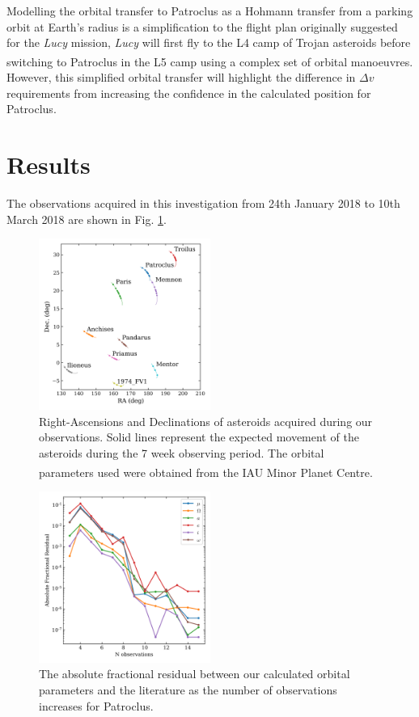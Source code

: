\documentclass[10pt, twocolumn]{revtex4}    %
\newcommand{\scite}[1]{\textsuperscript{\cite{#1}}}
\begin{document}
Modelling the orbital transfer to Patroclus as a Hohmann transfer from a parking orbit at Earth's radius is a simplification to the flight plan originally suggested for the \textit{Lucy} mission, \textit{Lucy} will first fly to the L4 camp of Trojan asteroids before switching to Patroclus in the L5 camp using a complex set of orbital manoeuvres.\scite{47thLunarPlanetary} However, this simplified orbital transfer will highlight the difference in $\Delta v$ requirements from increasing the confidence in the calculated position for Patroclus.

\section{Results} 

The observations acquired in this investigation from 24th January 2018 to 10th March 2018 are shown in Fig. \ref{fig: observations}.

\begin{figure}[h!]
\centering
\includegraphics[width=0.5\textwidth]{20180402_115205_OBSERVATIONS_MAP}
\caption{Right-Ascensions and Declinations of asteroids acquired during our observations. Solid lines represent the expected movement of the asteroids during the 7 week observing period. The orbital parameters used were obtained from the IAU Minor Planet Centre.\scite{IAUMinorPlanet}}
\label{fig: observations}
\end{figure}

\begin{figure}[h!]
\centering
\includegraphics[width=0.5\textwidth]{20180402_155517_PAT_LIT_CONVERGENCE}
\caption{The absolute fractional residual between our calculated orbital parameters and the literature as the number of observations increases for Patroclus.}
\label{fig: pat convergence}
\end{figure}
\end{document}
